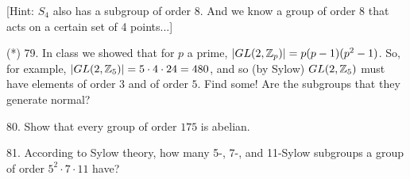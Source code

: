 \documentclass[12pt]{article}
\begin{document}
\begin{description}
\ssk

\item{\spc} [Hint: $S_4$ also has a subgroup of order 8. And we know a group of order 8 that acts on 
a certain set of 4 points...]

\msk

\item{(*) 79.} In class we showed that for $p$ a prime, $|GL(2,{\mathbb Z}_p)| = p(p-1)(p^2-1)$. 
So, for example, $|GL(2,{\mathbb Z}_5)|=5\cdot 4\cdot 24 = 480$, and so (by Sylow) 
$GL(2,{\mathbb Z}_5)$ must have elements
of order $3$ and of order $5$. Find some! Are the subgroups that they generate normal?

\msk

\item{80.} Show that every group of order $175$ is abelian. 

\msk

\item{81.} According to Sylow theory, how many 5-, 7-, and 11-Sylow subgroups
 a group of order $5^2\cdot 7\cdot 11$ have?


\end{description}
\vfill
\end{document}
